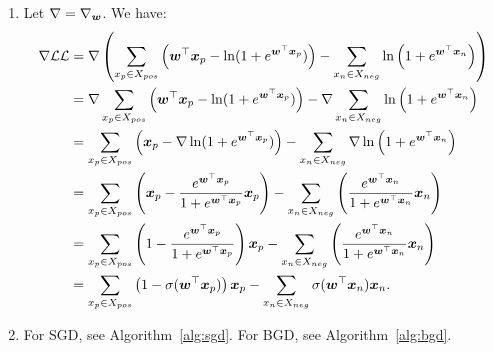 \documentclass[11pt,a4paper]{article}
\begin{document}
\begin{enumerate}[label=(\alph*)]
\begin{align}
                                  & = \sum_{x_p\in X_{pos}}\ln \frac{e^{\vw^\top\vx_p}}{1 + e^{\vw^\top\vx_p}} + \sum_{x_n\in X_{neg}}\ln\left(\frac{1}{1 + e^{\vw^\top\vx_n}}\right)                     \\
                                  & = \sum_{x_p\in X_{pos}} \left(\vw^\top\vx_p - \ln(1 + e^{\vw^\top\vx_p})\right) - \sum_{x_n\in X_{neg}}\ln\left(1 + e^{\vw^\top\vx_n}\right).
          \end{align}
    \item Let $\nabla=\nabla_{{\boldsymbol{w}}}$. We have:
          \begin{align}
              \nabla\mathcal{LL} & = \nabla \left(\sum_{x_p\in X_{pos}} \left({\boldsymbol{w}}^\top{\boldsymbol{x}}_p - \ln(1 + e^{{\boldsymbol{w}}^\top{\boldsymbol{x}}_p})\right) - \sum_{x_n\in X_{neg}}\ln\left(1 + e^{{\boldsymbol{w}}^\top{\boldsymbol{x}}_n}\right)\right)                           \\
                             & = \nabla\sum_{x_p\in X_{pos}} \left({\boldsymbol{w}}^\top{\boldsymbol{x}}_p - \ln(1 + e^{{\boldsymbol{w}}^\top{\boldsymbol{x}}_p})\right) - \nabla\sum_{x_n\in X_{neg}}\ln\left(1 + e^{{\boldsymbol{w}}^\top{\boldsymbol{x}}_n}\right)                                   \\
                             & = \sum_{x_p\in X_{pos}} \left({\boldsymbol{x}}_p - \nabla\ln(1 + e^{{\boldsymbol{w}}^\top{\boldsymbol{x}}_p})\right) - \sum_{x_n\in X_{neg}}\nabla\ln\left(1 + e^{{\boldsymbol{w}}^\top{\boldsymbol{x}}_n}\right)                                           \\
                             & = \sum_{x_p\in X_{pos}} \left({\boldsymbol{x}}_p - \frac{e^{{\boldsymbol{w}}^\top{\boldsymbol{x}}_p}}{1 + e^{{\boldsymbol{w}}^\top{\boldsymbol{x}}_p}}{\boldsymbol{x}}_p\right) - \sum_{x_n\in X_{neg}}\left(\frac{e^{{\boldsymbol{w}}^\top{\boldsymbol{x}}_n}}{1 + e^{{\boldsymbol{w}}^\top{\boldsymbol{x}}_n}}{\boldsymbol{x}}_n\right) \\
                             & = \sum_{x_p\in X_{pos}} \left(1 - \frac{e^{{\boldsymbol{w}}^\top{\boldsymbol{x}}_p}}{1 + e^{{\boldsymbol{w}}^\top{\boldsymbol{x}}_p}}\right){\boldsymbol{x}}_p - \sum_{x_n\in X_{neg}}\left(\frac{e^{{\boldsymbol{w}}^\top{\boldsymbol{x}}_n}}{1 + e^{{\boldsymbol{w}}^\top{\boldsymbol{x}}_n}}{\boldsymbol{x}}_n\right)     \\
                             & = \sum_{x_p\in X_{pos}} \left(1 - \sigma({\boldsymbol{w}}^\top{\boldsymbol{x}}_p)\right){\boldsymbol{x}}_p - \sum_{x_n\in X_{neg}}\sigma({\boldsymbol{w}}^\top{\boldsymbol{x}}_n){\boldsymbol{x}}_n.
          \end{align}
    \item For SGD, see Algorithm~\ref{alg:sgd}. For BGD, see
          Algorithm~\ref{alg:bgd}.


\end{enumerate}
\end{document}
